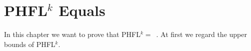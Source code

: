 \chapter{PHFL$^k$ Equals }
\label{ch:phfl_k_equals_k_exptime}
In this chapter we want to prove that PHFL$^k =$~. At first we regard the upper bounds of PHFL$^k$.



%
%
%
